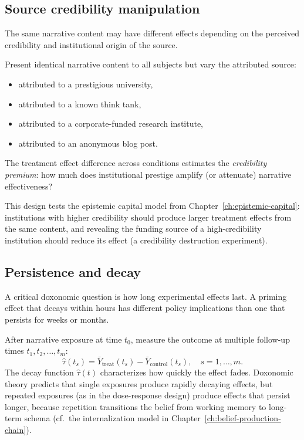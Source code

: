 \subsection{Source credibility manipulation}

The same narrative content may have different effects depending on the perceived credibility and institutional origin of the source.

\begin{model}
\label{mod:source-attribution}
Present identical narrative content to all subjects but vary the attributed source:
\begin{itemize}[nosep]
  \item attributed to a prestigious university,
  \item attributed to a known think tank,
  \item attributed to a corporate-funded research institute,
  \item attributed to an anonymous blog post.
\end{itemize}
The treatment effect difference across conditions estimates the \emph{credibility premium}: how much does institutional prestige amplify (or attenuate) narrative effectiveness?
\end{model}

This design tests the epistemic capital model from Chapter~\ref{ch:epistemic-capital}: institutions with higher credibility should produce larger treatment effects from the same content, and revealing the funding source of a high-credibility institution should reduce its effect (a credibility destruction experiment).

\subsection{Persistence and decay}

A critical doxonomic question is how long experimental effects last.
A priming effect that decays within hours has different policy implications than one that persists for weeks or months.

\begin{model}
\label{mod:persistence}
After narrative exposure at time $t_0$, measure the outcome at multiple follow-up times $t_1, t_2, \ldots, t_m$:
\[
  \hat{\tau}(t_s) = \bar{Y}_{\text{treat}}(t_s) - \bar{Y}_{\text{control}}(t_s), \quad s = 1, \ldots, m.
\]
The decay function $\hat{\tau}(t)$ characterizes how quickly the effect fades.
Doxonomic theory predicts that single exposures produce rapidly decaying effects, but repeated exposures (as in the dose-response design) produce effects that persist longer, because repetition transitions the belief from working memory to long-term schema (cf.\ the internalization model in Chapter~\ref{ch:belief-production-chain}).
\end{model}

